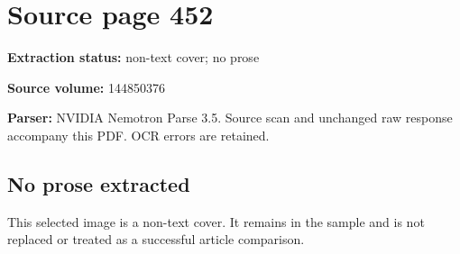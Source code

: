 \clearpage
\section{Source page 452}
\textbf{Extraction status:} non-text cover; no prose\par
\textbf{Source volume:} 144850376\par
\textbf{Parser:} NVIDIA Nemotron Parse 3.5. Source scan and unchanged raw response accompany this PDF. OCR errors are retained.\par\medskip
\subsection*{No prose extracted}
This selected image is a non-text cover. It remains in the sample and is not replaced or treated as a successful article comparison.
